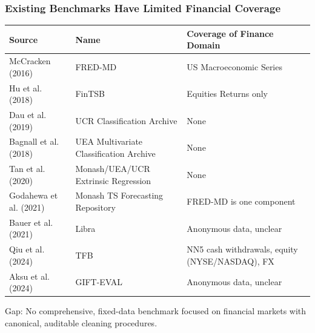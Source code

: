 \documentclass[ignorenonframetext, 9pt]{beamer}
\begin{document}
\begin{frame}
\frametitle{Existing Benchmarks Have Limited Financial Coverage}
\tiny
\begin{table}
\centering
\begin{tabular}{llp{4.5cm}}
\toprule
Source & Name & Coverage of Finance Domain \\
\midrule
McCracken (2016) & FRED-MD & US Macroeconomic Series \\
Hu et al. (2018) & FinTSB & Equities Returns only \\
Dau et al. (2019) & UCR Classification Archive & None \\
Bagnall et al. (2018) & UEA Multivariate Classification Archive & None \\
Tan et al. (2020) & Monash/UEA/UCR Extrinsic Regression & None \\
Godahewa et al. (2021) & Monash TS Forecasting Repository & FRED-MD is one component \\
Bauer et al. (2021) & Libra & Anonymous data, unclear \\
Qiu et al. (2024) & TFB & NN5 cash withdrawals, equity (NYSE/NASDAQ), FX \\
Aksu et al. (2024) & GIFT-EVAL & Anonymous data, unclear \\
\bottomrule
\end{tabular}
\end{table}
\vspace{0.3cm}
\alert{Gap:} No comprehensive, \alert{fixed-data} benchmark focused on financial markets with canonical, auditable cleaning procedures.
\end{frame}
\end{document}
